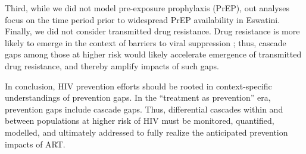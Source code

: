 Third, while we did not model pre-exposure prophylaxis (PrEP),
out analyses focus on the time period
prior to widespread PrEP availability in Eswatini.
Finally, we did not consider transmitted drug resistance.
Drug resistance is more likely to emerge
in the context of barriers to viral suppression \cite{Pham2014};
thus, cascade gaps among those at higher risk
would likely accelerate emergence of transmitted drug resistance,
and thereby amplify impacts of such gaps.
\par
In conclusion, HIV prevention efforts should be rooted in  
context-specific understandings of prevention gaps.
In the ``treatment as prevention'' era, prevention gaps include cascade gaps.
Thus, differential cascades within and between populations at higher risk of HIV
must be monitored, quantified, modelled, and ultimately addressed
to fully realize the anticipated prevention impacts of ART.
\enlargethispage{2ex} %
